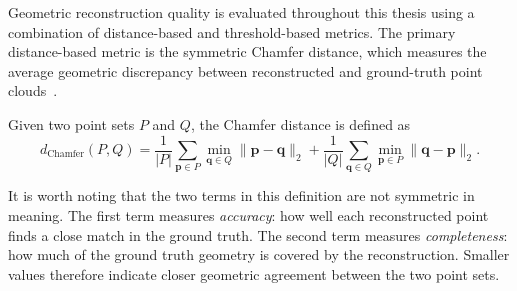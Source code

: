 Geometric reconstruction quality is evaluated throughout this thesis using a combination of distance-based and threshold-based metrics. The primary distance-based metric is the symmetric Chamfer distance, which measures the average geometric discrepancy between reconstructed and ground-truth point clouds~\cite{chamfer1977image}.

Given two point sets $P$ and $Q$, the Chamfer distance is defined as
\begin{equation}
d_{\mathrm{Chamfer}}(P,Q) = \frac{1}{|P|}\sum_{\mathbf{p}\in P}\min_{\mathbf{q}\in Q}\|\mathbf{p}-\mathbf{q}\|_2 + \frac{1}{|Q|}\sum_{\mathbf{q}\in Q}\min_{\mathbf{p}\in P}\|\mathbf{q}-\mathbf{p}\|_2.
\end{equation}

It is worth noting that the two terms in this definition are not symmetric in meaning. The first term measures \emph{accuracy}: how well each reconstructed point finds a close match in the ground truth. The second term measures \emph{completeness}: how much of the ground truth geometry is covered by the reconstruction. Smaller values therefore indicate closer geometric agreement between the two point sets.